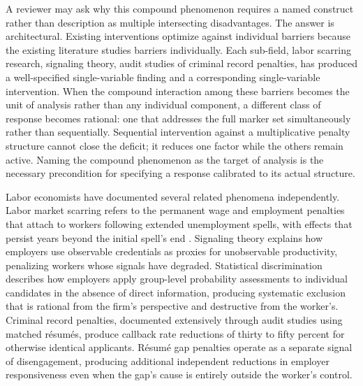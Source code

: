 \documentclass[12pt, letterpaper]{article}
\begin{document}
A reviewer may ask why this compound phenomenon requires a named construct rather than description as multiple intersecting disadvantages. The answer is architectural. Existing interventions optimize against individual barriers because the existing literature studies barriers individually. Each sub-field, labor scarring research, signaling theory, audit studies of criminal record penalties, has produced a well-specified single-variable finding and a corresponding single-variable intervention. When the compound interaction among these barriers becomes the unit of analysis rather than any individual component, a different class of response becomes rational: one that addresses the full marker set simultaneously rather than sequentially. Sequential intervention against a multiplicative penalty structure cannot close the deficit; it reduces one factor while the others remain active. Naming the compound phenomenon as the target of analysis is the necessary precondition for specifying a response calibrated to its actual structure.

Labor economists have documented several related phenomena independently. Labor market scarring refers to the permanent wage and employment penalties that attach to workers following extended unemployment spells, with effects that persist years beyond the initial spell's end \cite{pager2003mark}. Signaling theory explains how employers use observable credentials as proxies for unobservable productivity, penalizing workers whose signals have degraded. Statistical discrimination describes how employers apply group-level probability assessments to individual candidates in the absence of direct information, producing systematic exclusion that is rational from the firm's perspective and destructive from the worker's. Criminal record penalties, documented extensively through audit studies using matched r\'{e}sum\'{e}s, produce callback rate reductions of thirty to fifty percent for otherwise identical applicants. R\'{e}sum\'{e} gap penalties operate as a separate signal of disengagement, producing additional independent reductions in employer responsiveness even when the gap's cause is entirely outside the worker's control.
\end{document}
